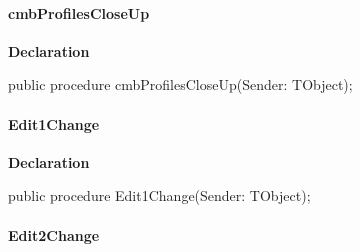 \documentclass{report}
\newif\ifpdf
\begin{document}
\paragraph*{cmbProfilesCloseUp}\hspace*{\fill}

\label{prjwizard.TfrmProjectWizard-cmbProfilesCloseUp}
\begin{list}{}{
\setlength{\itemindent}{0cm}
\setlength{\listparindent}{0cm}
\setlength{\leftmargin}{\evensidemargin}
\addtolength{\leftmargin}{\tmplength}
\settowidth{\labelsep}{X}
\addtolength{\leftmargin}{\labelsep}
\setlength{\labelwidth}{\tmplength}
}
\item[\textbf{Declaration}\hfill]
\ifpdf
\begin{flushleft}
\fi
\begin{ttfamily}
public procedure cmbProfilesCloseUp(Sender: TObject);\end{ttfamily}

\ifpdf
\end{flushleft}
\fi

\end{list}
\paragraph*{Edit1Change}\hspace*{\fill}

\label{prjwizard.TfrmProjectWizard-Edit1Change}
\begin{list}{}{
\setlength{\itemindent}{0cm}
\setlength{\listparindent}{0cm}
\setlength{\leftmargin}{\evensidemargin}
\addtolength{\leftmargin}{\tmplength}
\settowidth{\labelsep}{X}
\addtolength{\leftmargin}{\labelsep}
\setlength{\labelwidth}{\tmplength}
}
\item[\textbf{Declaration}\hfill]
\ifpdf
\begin{flushleft}
\fi
\begin{ttfamily}
public procedure Edit1Change(Sender: TObject);\end{ttfamily}

\ifpdf
\end{flushleft}
\fi

\end{list}
\paragraph*{Edit2Change}\hspace*{\fill}
\end{document}
